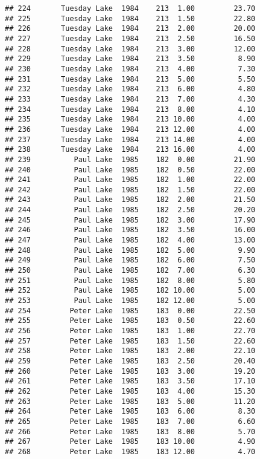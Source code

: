 \documentclass[
]{article}
\begin{document}
\begin{verbatim}
## 224       Tuesday Lake  1984    213  1.00         23.70
## 225       Tuesday Lake  1984    213  1.50         22.80
## 226       Tuesday Lake  1984    213  2.00         20.00
## 227       Tuesday Lake  1984    213  2.50         16.50
## 228       Tuesday Lake  1984    213  3.00         12.00
## 229       Tuesday Lake  1984    213  3.50          8.90
## 230       Tuesday Lake  1984    213  4.00          7.30
## 231       Tuesday Lake  1984    213  5.00          5.50
## 232       Tuesday Lake  1984    213  6.00          4.80
## 233       Tuesday Lake  1984    213  7.00          4.30
## 234       Tuesday Lake  1984    213  8.00          4.10
## 235       Tuesday Lake  1984    213 10.00          4.00
## 236       Tuesday Lake  1984    213 12.00          4.00
## 237       Tuesday Lake  1984    213 14.00          4.00
## 238       Tuesday Lake  1984    213 16.00          4.00
## 239          Paul Lake  1985    182  0.00         21.90
## 240          Paul Lake  1985    182  0.50         22.00
## 241          Paul Lake  1985    182  1.00         22.00
## 242          Paul Lake  1985    182  1.50         22.00
## 243          Paul Lake  1985    182  2.00         21.50
## 244          Paul Lake  1985    182  2.50         20.20
## 245          Paul Lake  1985    182  3.00         17.90
## 246          Paul Lake  1985    182  3.50         16.00
## 247          Paul Lake  1985    182  4.00         13.00
## 248          Paul Lake  1985    182  5.00          9.90
## 249          Paul Lake  1985    182  6.00          7.50
## 250          Paul Lake  1985    182  7.00          6.30
## 251          Paul Lake  1985    182  8.00          5.80
## 252          Paul Lake  1985    182 10.00          5.00
## 253          Paul Lake  1985    182 12.00          5.00
## 254         Peter Lake  1985    183  0.00         22.50
## 255         Peter Lake  1985    183  0.50         22.60
## 256         Peter Lake  1985    183  1.00         22.70
## 257         Peter Lake  1985    183  1.50         22.60
## 258         Peter Lake  1985    183  2.00         22.10
## 259         Peter Lake  1985    183  2.50         20.40
## 260         Peter Lake  1985    183  3.00         19.20
## 261         Peter Lake  1985    183  3.50         17.10
## 262         Peter Lake  1985    183  4.00         15.30
## 263         Peter Lake  1985    183  5.00         11.20
## 264         Peter Lake  1985    183  6.00          8.30
## 265         Peter Lake  1985    183  7.00          6.60
## 266         Peter Lake  1985    183  8.00          5.70
## 267         Peter Lake  1985    183 10.00          4.90
## 268         Peter Lake  1985    183 12.00          4.70

\end{verbatim}
\end{document}
